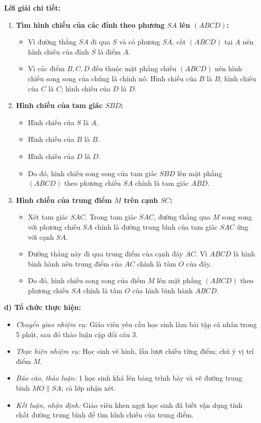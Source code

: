\documentclass[12pt, a4paper]{article}
\begin{document}
\textbf{Lời giải chi tiết:}
\begin{enumerate}[leftmargin=0.6cm]
    \item \textbf{Tìm hình chiếu của các đỉnh theo phương $SA$ lên $(ABCD)$:}
    \begin{itemize}
        \item Vì đường thẳng $SA$ đi qua $S$ và có phương $SA$, cắt $(ABCD)$ tại $A$ nên hình chiếu của đỉnh $S$ là điểm $A$.
        \item Vì các điểm $B, C, D$ đều thuộc mặt phẳng chiếu $(ABCD)$ nên hình chiếu song song của chúng là chính nó:
        Hình chiếu của $B$ là $B$; hình chiếu của $C$ là $C$; hình chiếu của $D$ là $D$.
    \end{itemize}

    \item \textbf{Hình chiếu của tam giác $SBD$:}
    \begin{itemize}
        \item Hình chiếu của $S$ là $A$.
        \item Hình chiếu của $B$ là $B$.
        \item Hình chiếu của $D$ là $D$.
        \item Do đó, hình chiếu song song của tam giác $SBD$ lên mặt phẳng $(ABCD)$ theo phương chiếu $SA$ chính là tam giác $ABD$.
    \end{itemize}

    \item \textbf{Hình chiếu của trung điểm $M$ trên cạnh $SC$:}
    \begin{itemize}
        \item Xét tam giác $SAC$. Trong tam giác $SAC$, đường thẳng qua $M$ song song với phương chiếu $SA$ chính là đường trung bình của tam giác $SAC$ ứng với cạnh $SA$.
        \item Đường thẳng này đi qua trung điểm của cạnh đáy $AC$. Vì $ABCD$ là hình bình hành nên trung điểm của $AC$ chính là tâm $O$ của đáy.
        \item Do đó, hình chiếu song song của điểm $M$ lên mặt phẳng $(ABCD)$ theo phương chiếu $SA$ chính là tâm $O$ của hình bình hành $ABCD$.
    \end{itemize}
\end{enumerate}

\noindent \textbf{d) Tổ chức thực hiện:}
\begin{itemize}[leftmargin=0.8cm]
    \item \textit{Chuyển giao nhiệm vụ:} Giáo viên yêu cầu học sinh làm bài tập cá nhân trong 5 phút, sau đó thảo luận cặp đôi câu 3.
    \item \textit{Thực hiện nhiệm vụ:} Học sinh vẽ hình, lần lượt chiếu từng điểm; chú ý vị trí điểm $M$.
    \item \textit{Báo cáo, thảo luận:} 1 học sinh khá lên bảng trình bày và vẽ đường trung bình $MO \parallel SA$; cả lớp nhận xét.
    \item \textit{Kết luận, nhận định:} Giáo viên khen ngợi học sinh đã biết vận dụng tính chất đường trung bình để tìm hình chiếu của trung điểm.
\end{itemize}
\end{document}

